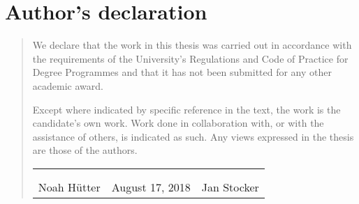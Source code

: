\chapter*{Author's declaration}
\begin{SingleSpace}
\begin{quote}
We declare that the work in this thesis was carried out in accordance with
the requirements of the University's Regulations and Code of Practice for 
Degree Programmes and that it has not been submitted for any other
academic award.

Except where indicated by specific reference in the text, the
work is the candidate's own work. Work done in collaboration with, or with the
assistance of others, is indicated as such. Any views expressed in the
thesis are those of the authors.

\vspace{3cm}

    \begin{tabular}{p{5cm} p{3cm} p{5cm}}
         & & \\ \cline{1-1} \cline{3-3} 
        \vspace{1ex} & & \\
        \multicolumn{1}{c}{Noah H\"utter} &
        August 17, 2018
         & \multicolumn{1}{c}{Jan Stocker} \\
    \end{tabular}




\end{quote}
\end{SingleSpace}
\clearpage